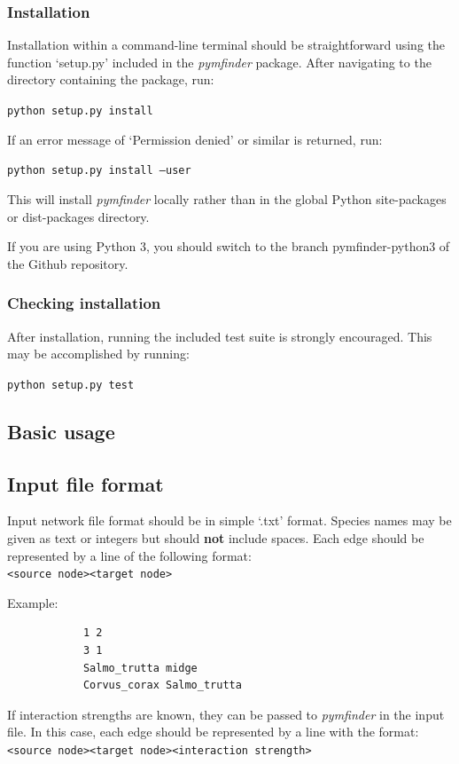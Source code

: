 \documentclass[12pt]{article}
\newcommand\tab[1][1cm]{\hspace*{#1}}
\begin{document}
		\subsubsection{Installation}
			Installation within a command-line terminal should be straightforward using the function `setup.py' included in the \emph{pymfinder} package. After navigating to the directory containing the package, run:

			\tab\texttt{python setup.py install}

			If an error message of `Permission denied' or similar is returned, run:

			\tab\texttt{python setup.py install --user}

			This will install \emph{pymfinder} locally rather than in the global Python site-packages or dist-packages directory. 
			
			If you are using Python 3, you should switch to the branch pymfinder-python3 of the Github repository.

		\subsubsection{Checking installation}
			After installation, running the included test suite is strongly encouraged. This may be accomplished by running:

			\tab\texttt{python setup.py test}

	\subsection{Basic usage}
		\subsection{Input file format}
			Input network file format should be in simple `.txt' format. Species names may be given as text or integers but should \textbf{not} include spaces. Each edge should be represented by a line of the following format:\\
			\texttt{\textless source node\textgreater  \textless target node\textgreater}

			Example:
			\begin{lstlisting}
			1 2
			3 1
			Salmo_trutta midge
			Corvus_corax Salmo_trutta
			\end{lstlisting}

			If interaction strengths are known, they can be passed to \emph{pymfinder} in the input file. In this case, each edge should be represented by a line with the format:\\
			\texttt{\textless source node\textgreater \textless target node\textgreater \textless interaction strength\textgreater}
\end{document}
